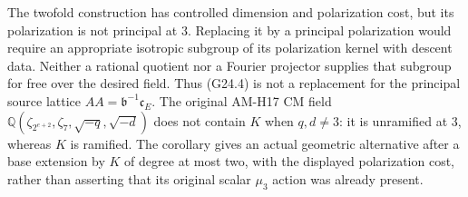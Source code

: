 \begin{remark}
The twofold construction has controlled dimension and polarization
cost, but its polarization is not principal at $3$.  Replacing it
by a principal polarization would require an appropriate isotropic
subgroup of its polarization kernel with descent data.  Neither a
rational quotient nor a Fourier projector supplies that subgroup
for free over the desired field.  Thus (G24.4) is not a replacement
for the principal source lattice $AA=\mathfrak b^{-1}\mathfrak c_E$.
The original AM-H17 CM field
$\mathbb Q(\zeta_{2^{e+2}},\zeta_7,\sqrt{-q},\sqrt{-d})$
does not contain $K$ when $q,d\ne3$: it is unramified at $3$,
whereas $K$ is ramified.  The corollary gives an actual geometric
alternative after a base extension by $K$ of degree at most two,
with the displayed polarization cost, rather than asserting that
its original scalar $\mu_3$ action was already present.
\end{remark}


